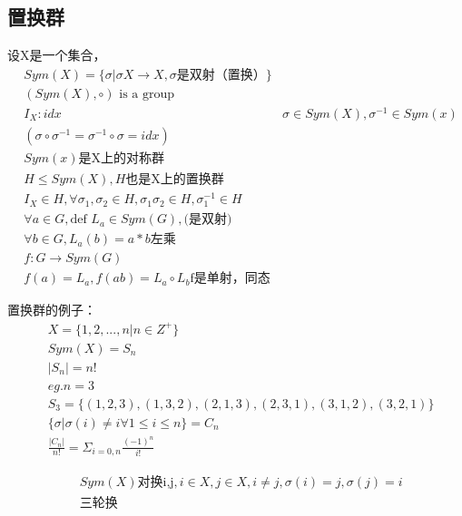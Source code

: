 \documentclass[12pt, a4paper]{article}  %
\begin{document}
\subsection{置换群}
设X是一个集合，
\begin{align}
    &Sym(X)=\{\sigma |\sigma X\rightarrow X,\sigma\text{是双射（置换）}\}\\
    &(Sym(X),\circ) \text{ is a group}\\
    &I_X:idx
    &\sigma \in Sym(X),\sigma^{-1}\in Sym(x)\\
    &(\sigma \circ \sigma^{-1}=\sigma^{-1}\circ \sigma =idx)\\
    &Sym(x)\text{是X上的对称群}\\
    &H\leqslant Sym(X),H\text{也是X上的置换群}\\
    & I_X\in H,\forall \sigma_1,\sigma_2\in H,\sigma_1\sigma_2\in H,\sigma_1^{-1}\in H\\
    &\forall a\in G,\text{def }L_a\in Sym(G),\text{(是双射)}\\
    &\forall b\in G,L_a(b)=a*b\text{左乘}\\
    &f:G \rightarrow Sym(G)\\
    &f(a)=L_a,f(ab)=L_a\circ L_b\text{f是单射，同态}
\end{align}

置换群的例子：
\begin{align}
    &X=\{1,2,...,n|n\in Z^{+}\}\\
    &Sym(X)=S_n\\
    & |S_n|=n!\\
    &eg. n=3\\
    &S_3=\{(1,2,3),(1,3,2),(2,1,3),(2,3,1),(3,1,2),(3,2,1)\}\\
    &\{\sigma |\sigma(i)\neq i\forall 1\leqslant i\leqslant n\}=C_n\\
    &\frac{|C_n|}{n!}=\Sigma_{i=0,n} \frac{(-1)^n}{i!}
\end{align}

\begin{align}
    &Sym(X) \text{对换i,j},i\in X,j\in X,i\neq j,\sigma(i)=j,\sigma(j)=i\\
    &\text{三轮换}
\end{align}
\end{document}
